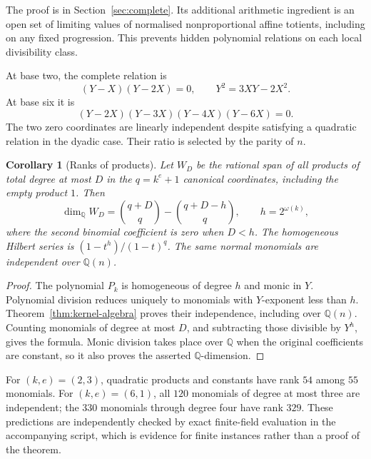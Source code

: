 \documentclass[11pt,a4paper]{article}
\newtheorem{corollary}[theorem]{Corollary}
\theoremstyle{definition}\newtheorem{definition}[theorem]{Definition}
\theoremstyle{remark}\newtheorem{remark}[theorem]{Remark}
\newcommand{\Q}{\mathbb Q}\newcommand{\R}{\mathbb R}\newcommand{\Z}{\mathbb Z}\newcommand{\N}{\mathbb N}
\begin{document}
The proof is in Section~\ref{sec:complete}. Its additional arithmetic ingredient
is an open set of limiting values of normalised nonproportional affine totients,
including on any fixed progression. This prevents hidden polynomial relations
on each local divisibility class.

At base two, the complete relation is
\begin{equation}\label{eq:dyadicpoly}
 (Y-X)(Y-2X)=0,\qquad Y^2=3XY-2X^2.
\end{equation}
At base six it is
\[
 (Y-2X)(Y-3X)(Y-4X)(Y-6X)=0.
\]
The two zero coordinates are linearly independent despite satisfying a quadratic
relation in the dyadic case. Their ratio is selected by the parity of $n$.

\begin{corollary}[Ranks of products]\label{cor:hilbert}
Let $W_D$ be the rational span of all products of total degree at most $D$ in
the $q=k^e+1$ canonical coordinates, including the empty product $1$.
Then
\[
 \dim_\Q W_D=\binom{q+D}{q}-\binom{q+D-h}{q},
 \qquad h=2^{\omega(k)},
\]
where the second binomial coefficient is zero when $D<h$.
The homogeneous Hilbert series is $(1-t^h)/(1-t)^q$.
The same normal monomials are independent over $\Q(n)$.
\end{corollary}
\begin{proof}
The polynomial $P_k$ is homogeneous of degree $h$ and monic in $Y$.
Polynomial division reduces uniquely to monomials with $Y$-exponent less than $h$.
Theorem~\ref{thm:kernel-algebra} proves their independence, including over $\Q(n)$.
Counting monomials of degree at most $D$, and subtracting those divisible by
$Y^h$, gives the formula. Monic division takes place over $\Q$ when the original
coefficients are constant, so it also proves the asserted $\Q$-dimension.
\end{proof}

For $(k,e)=(2,3)$, quadratic products and constants have rank $54$ among $55$
monomials. For $(k,e)=(6,1)$, all $120$ monomials of degree at most three are
independent; the $330$ monomials through degree four have rank $329$.
These predictions are independently checked by exact finite-field evaluation
in the accompanying script, which is evidence for finite instances rather than
a proof of the theorem.
\end{document}

